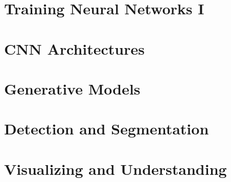 \documentclass[12pt]{scrartcl}
\begin{document}
\section{Training Neural Networks I}

\section{CNN Architectures}

\section{Generative Models}

\section{Detection and Segmentation}

\section{Visualizing and Understanding}
\end{document}
